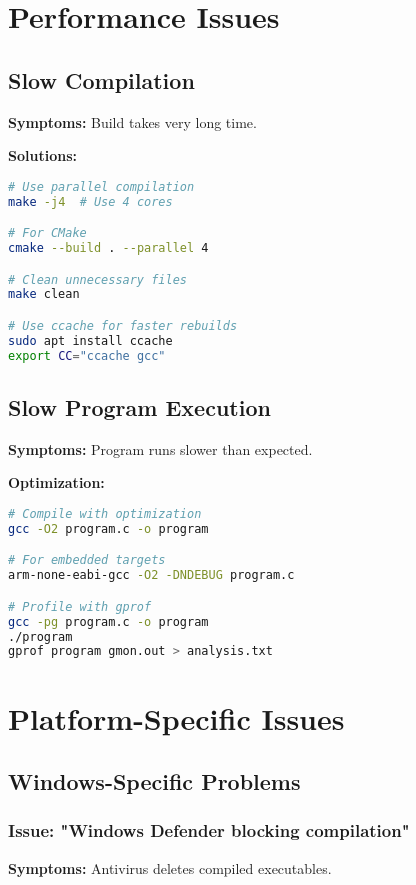 \documentclass[11pt,a4paper]{article}
\begin{document}
\section{Performance Issues}

\subsection{Slow Compilation}

\textbf{Symptoms:} Build takes very long time.

\textbf{Solutions:}
\begin{lstlisting}[language=bash]
# Use parallel compilation
make -j4  # Use 4 cores

# For CMake
cmake --build . --parallel 4

# Clean unnecessary files
make clean

# Use ccache for faster rebuilds
sudo apt install ccache
export CC="ccache gcc"
\end{lstlisting}

\subsection{Slow Program Execution}

\textbf{Symptoms:} Program runs slower than expected.

\textbf{Optimization:}
\begin{lstlisting}[language=bash]
# Compile with optimization
gcc -O2 program.c -o program

# For embedded targets
arm-none-eabi-gcc -O2 -DNDEBUG program.c

# Profile with gprof
gcc -pg program.c -o program
./program
gprof program gmon.out > analysis.txt
\end{lstlisting}

\section{Platform-Specific Issues}

\subsection{Windows-Specific Problems}

\subsubsection{Issue: "Windows Defender blocking compilation"}
\textbf{Symptoms:} Antivirus deletes compiled executables.
\end{document}

